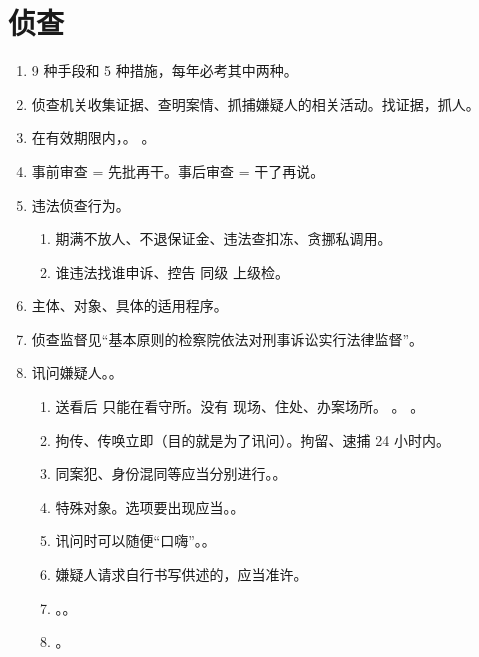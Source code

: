 \section{侦查}
\begin{enumerate}
  \item 9 种手段和 5 种措施，每年必考其中两种。
  \item 侦查机关收集证据、查明案情、抓捕嫌疑人的相关活动。找证据，抓人。
  \item 在有效期限内，。
        。
  \item 事前审查 = 先批再干。事后审查 = 干了再说。
  \item 违法侦查行为。
        \begin{enumerate}
          \item 期满不放人、不退保证金、违法查扣冻、贪挪私调用。
          \item 谁违法找谁申诉、控告 \yjt 同级 \yjt 上级检。
        \end{enumerate}
  \item 主体、对象、具体的适用程序。
  \item 侦查监督见“基本原则的检察院依法对刑事诉讼实行法律监督”。
  \item 讯问嫌疑人。。
        \begin{enumerate}
          \item 送看后 \yjt 只能在看守所。没有 \yjt 现场、住处、办案场所。
                。
                。
          \item 拘传、传唤立即（目的就是为了讯问）。拘留、速捕 24 小时内。
          \item 同案犯、身份混同等应当分别进行。。
          \item 特殊对象。选项要出现应当。。
          \item 讯问时可以随便“口嗨”。。
          \item 嫌疑人请求自行书写供述的，应当准许。
          \item {}。。
          \item {}。
        \end{enumerate}

\end{enumerate}
